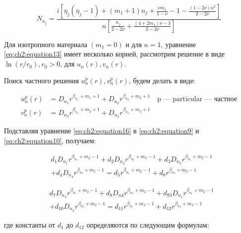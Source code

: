 \begin{equation}
\label{eq:ch2:equation15}
	N_{n_j} = \frac{i \left [ \eta_j \left (\eta_j -1 \right ) + \left ( m_1 +1 \right ) n_j +\frac{\nu m_1}{1-\nu} -1 - \frac{\left (1-2\nu \right ) n^2}{2-2\nu} \right ]}{n \left [ \frac{n_j}{2-2\nu} + \frac{\left (4+2m_1 \right )\nu -3}{2-2\nu} \right ]}
\end{equation}

Для изотропного материала \((m_1=0) \) и для \(n=1\), уравнение \cref{eq:ch2:equation13} имеет несколько корней, рассмотрим решение в виде \( \ln{(r/r_0)},  r_0 > 0\), для \(u_n(r), v_n(r) \).

Поиск частного решения \(u_n^p(r), v_n^p(r) \), будем делать в виде:

\begin{equation}
\label{eq:ch2:equation16}
\begin{split}
	u_n^p(r) &= D_{n_1} r^{\beta_{n_1} + m_1 + 1} + D_{n_2} r^{\beta_{n_2} +m_2 + 1} \quad \text{p --- particular --- частное}\\
	v_n^p(r) &= D_{n_3} r^{\beta_{n_1} + m_2 + 1} + D_{n_2} r^{\beta_{n_4} +m_2 + 1}
\end{split}
\end{equation}

Подставляя уравнение \cref{eq:ch2:equation16} в \cref{eq:ch2:equation9} и \cref{eq:ch2:equation10}, получаем:

\begin{equation}
\label{eq:ch2:equation17}
\begin{split}
	&d_1 D_{n_1} r^{\beta_{n_1}+m_2-1} + d_2 D_{n_2} r^{\beta_{n_2}+m_2-1} + d_3 D_{n_3} r^{\beta_{n_1}+m_2-1} \\
	&+d_4 D_{n_4} r^{\beta_{n_2}+m_2-1} = d_5  r^{\beta_{n_1}+m_2-1} + d_6  r^{\beta_{n_2}+m_2-1}
\end{split}
\end{equation}

\begin{equation}
\label{eq:ch2:equation18}
\begin{split}
	&d_7 D_{n_3} r^{\beta_{n_1}+m_2-1} + d_8 D_{n4} r^{\beta_{n_2}+m_2-1} + d_93 D_{n_1} r^{\beta_{n_1}+m_2-1} \\
	&+d_{10} D_{n_2} r^{\beta_{n_2}+m_2-1} = d_{11} r^{\beta_{n_1}+m_2-1} + d_{12}  r^{\beta_{n_2}+m_2-1}
\end{split}
\end{equation}

где константы от \(d_1\) до \(d_{12}\) определяются по следующим формулам:

